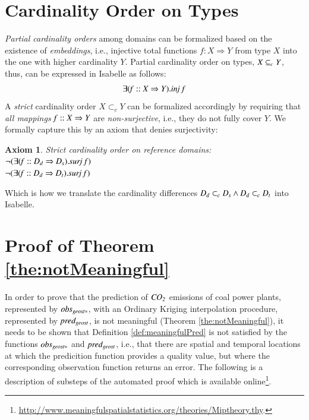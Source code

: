 \documentclass[final,authoryear,1p,times]{elsarticle}
\newtheorem{Axiom}{Axiom}
\begin{document}



\appendix

\section{Cardinality Order on Types}
\label{appendix:sortCardinality}

\textit{Partial cardinality orders} among domains can be formalized based on the existence of \textit{embeddings}, i.e., injective total functions $f:X\Rightarrow Y$ from type $X$ into the one with higher cardinality $Y$. Partial cardinality order on types,  ${\it X \subseteq_{c} Y}$, thus, can be expressed in Isabelle as follows:
 $$
{\it \exists (f:: X \Rightarrow Y). inj\; f}
$$
\label{subseteqc1}
A \textit{strict} cardinality order $X \subset_{c} Y$ can be formalized accordingly by requiring that \textit{all mappings} ${\it f::X\Rightarrow Y}$ are \textit{non-surjective}, i.e., they do not fully cover $Y$. We formally capture this by an axiom that denies surjectivity:
  \begin{Axiom}
Strict cardinality order on reference domains:\\
 ${\it 
 \neg (\exists (f::D_d \Rightarrow D_s). surj\; f)}$\\
 ${\it \neg (\exists (f::D_d \Rightarrow D_t). surj\; f) }$
\label{subseteqc}
\end{Axiom}
Which is how we translate the cardinality differences ${\it D_d \subset_{c} D_s \wedge D_d \subset_{c} D_t}$ into Isabelle.

\section{Proof of Theorem \ref{the:notMeaningful}}
\label{appendix:theorem3proof}

In order to prove that the prediction of ${\it CO_2}$ emissions of coal power plants, represented by ${\it obs_{geost*}}$, with an Ordinary Kriging interpolation procedure, represented by ${\it pred_{geost}}$, is not meaningful (Theorem \ref{the:notMeaningful}), it needs to be shown that Definition \ref{def:meaningfulPred} is not satisfied by the functions ${\it obs_{geost*}}$ and ${\it pred_{geost}}$, i.e., that there are spatial and temporal locations at which the predicition function provides a quality value, but where the corresponding observation function returns an error. The following is a description of substeps of the automated proof which is available online\footnote{\url{http://www.meaningfulspatialstatistics.org/theories/Miptheory.thy}.}.
\end{document}
